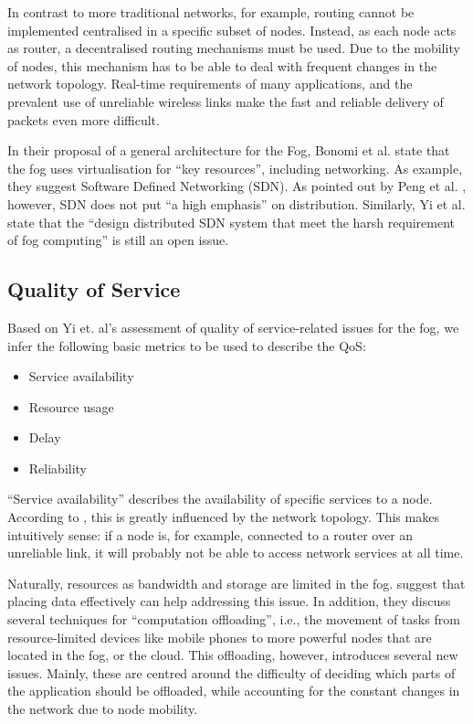 \documentclass{article}
\begin{document}
In contrast to more traditional networks, for example, routing cannot be implemented centralised in a specific subset of nodes. Instead, as each node acts as router, a decentralised routing mechanisms must be used. Due to the mobility of nodes, this mechanism has to be able to deal with frequent changes in the network topology. Real-time requirements of many applications, and the prevalent use of unreliable wireless links make the fast and reliable delivery of packets even more difficult.

In their proposal of a general architecture for the Fog, Bonomi et al. \cite{bonomi2014fog} state that the fog uses virtualisation for ``key resources'', including networking. As example, they suggest Software Defined Networking (SDN). As pointed out by Peng et al. \cite{peng2016fog}, however, SDN does not put ``a high emphasis'' on distribution. Similarly, Yi et al. state that the ``design distributed SDN system that meet the harsh requirement of fog computing'' is still an open issue.

\subsection{Quality of Service}
\label{sub_issues_qos}

Based on Yi et. al's assessment of quality of service-related issues for the fog, we infer the following basic metrics to be used to describe the QoS:

\begin{itemize}
	\item Service availability
	\item Resource usage
	\item Delay
	\item Reliability
\end{itemize}

``Service availability'' describes the availability of specific services to a node. According to \cite{yi2015survey}, this is greatly influenced by the network topology. This makes intuitively sense: if a node is, for example, connected to a router over an unreliable link, it will probably not be able to access network services at all time.

Naturally, resources as bandwidth and storage are limited in the fog. \cite{yi2015survey} suggest that placing data effectively can help addressing this issue. In addition, they discuss several techniques for ``computation offloading'', i.e., the movement of tasks from resource-limited devices like mobile phones to more powerful nodes that are located in the fog, or the cloud. This offloading, however, introduces several new issues. Mainly, these are centred around the difficulty of deciding which parts of the application should be offloaded, while accounting for the constant changes in the network due to node mobility.
\end{document}

